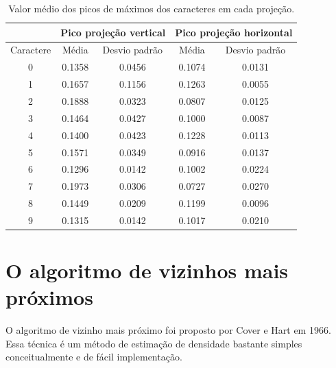 \documentclass[letterpaper, 10 pt, conference]{ieeeconf}  %
\begin{document}
\begin{table}[h]
\centering
\begin{tabular}{|c|c|c|c|c|}
\hline
          & \multicolumn{2}{c|}{Pico projeção vertical} & \multicolumn{2}{c|}{Pico projeção horizontal} \\ \hline
Caractere & Média             & Desvio padrão           & Média              & Desvio padrão            \\ \hline
0         & 0.1358            & 0.0456                  & 0.1074             & 0.0131                   \\ \hline
1         & 0.1657            & 0.1156                  & 0.1263             & 0.0055                   \\ \hline
2         & 0.1888            & 0.0323                  & 0.0807             & 0.0125                   \\ \hline
3         & 0.1464            & 0.0427                  & 0.1000             & 0.0087                   \\ \hline
4         & 0.1400            & 0.0423                  & 0.1228             & 0.0113                   \\ \hline
5         & 0.1571            & 0.0349                  & 0.0916             & 0.0137                   \\ \hline
6         & 0.1296            & 0.0142                  & 0.1002             & 0.0224                   \\ \hline
7         & 0.1973            & 0.0306                  & 0.0727             & 0.0270                   \\ \hline
8         & 0.1449            & 0.0209                  & 0.1199             & 0.0096                   \\ \hline
9         & 0.1315            & 0.0142                  & 0.1017             & 0.0210                   \\ \hline
\end{tabular}
\caption{Valor médio dos picos de máximos dos caracteres em cada projeção.}
\end{table}





\section{O algoritmo de vizinhos mais próximos}

O algoritmo de vizinho mais próximo foi proposto por Cover e Hart em 1966. Essa técnica é um método de estimação de densidade bastante simples conceitualmente e de fácil implementação.
\end{document}
